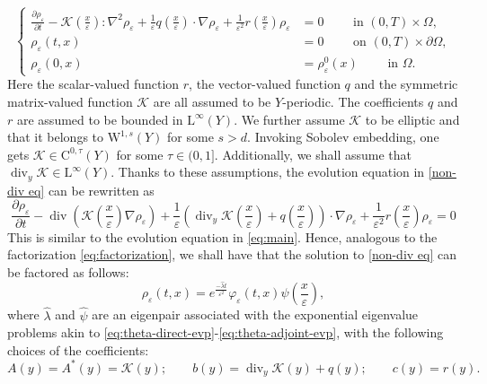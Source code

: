\documentclass[preprint, 12pt]{amsart}
\numberwithin{equation}{section}
\numberwithin{equation}{section}
\newcommand{\eps}{\varepsilon}
\DeclareMathOperator{\dv}{div}
\begin{document}
\begin{equation}\label{non-div eq}
\left\{
\begin{aligned}
\frac{\partial \rho_{\eps}}{\partial t} - \mathcal{K}\left(\frac{x}{\eps}\right) : \nabla^2 \rho_\eps + \frac{1}{\eps}q\left(\frac{x}{\eps}\right)\cdot\nabla \rho_\eps + \frac{1}{\eps^2}r\left(\frac{x}{\eps}\right)\rho_{\eps} & = 0 \qquad \mbox{ in }(0,T) \times \Omega,
\\
\rho_{\eps}(t,x) & = 0\qquad \mbox{ on } (0,T)\times \partial \Omega,
\\
\rho_{\eps}(0,x) & = \rho_{\eps}^0(x) \qquad \mbox{ in }\Omega.
 \end{aligned}
\right.
\end{equation}
Here the scalar-valued function $r$, the vector-valued function $q$ and the symmetric matrix-valued function $\mathcal{K}$ are all assumed to be $Y$-periodic. The coefficients $q$ and $r$ are assumed to be bounded in $\mathrm L^\infty(Y)$. We further assume $\mathcal{K}$ to be elliptic and that it belongs to $\mathrm W^{1,s}(Y)$ for some $s>d$. Invoking Sobolev embedding, one gets $\mathcal{K}\in\mathrm C^{0,\tau}(Y)$ for some $\tau\in(0,1]$. Additionally, we shall assume that $\dv_y \mathcal{K}\in \mathrm L^\infty(Y)$. Thanks to these assumptions, the evolution equation in \eqref{non-div eq} can be rewritten as
\begin{equation*}
\frac{\partial \rho_{\eps}}{\partial t} - \dv \left(\mathcal{K}\left(\frac{x}{\eps}\right) \nabla \rho_\eps\right) + \frac{1}{\eps}\left(\dv_y \mathcal{K}\left(\frac{x}{\eps}\right) + q\left(\frac{x}{\eps}\right)\right)\cdot\nabla \rho_\eps + \frac{1}{\eps^2}r\left(\frac{x}{\eps}\right)\rho_{\eps} = 0
\end{equation*}
This is similar to the evolution equation in \eqref{eq:main}. Hence, analogous to the factorization \eqref{eq:factorization}, we shall have that the solution to \eqref{non-div eq} can be factored as follows:
\begin{equation}\label{eq:factorization-nondiv}
\rho_{\varepsilon}(t,x)=e^{\frac{-\widehat\lambda t}{\varepsilon^2}} \varphi_{\varepsilon}(t,x)\widehat\psi\left(\frac{x}{\varepsilon}\right),
\end{equation}
where $\widehat\lambda$ and $\widehat\psi$ are an eigenpair associated with the exponential eigenvalue problems akin to \eqref{eq:theta-direct-evp}-\eqref{eq:theta-adjoint-evp}, with the following choices of the coefficients:
\begin{equation*}
A(y) = A^\ast(y) = \mathcal{K}(y);
\qquad
b(y) = \dv_y\mathcal{K}(y) + q(y);
\qquad
c(y) = r(y).
\end{equation*}
\end{document}
